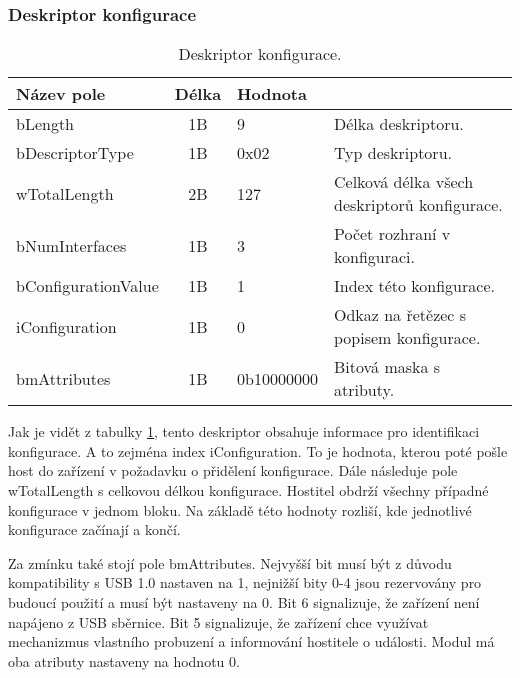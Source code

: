 \subsubsection{Deskriptor konfigurace}
\begin{table}[ht!]
\begin{center}
\begin{tabular}{|l|c|l|l|}
\hline 
Název pole & Délka & Hodnota &  \\ 
\hline
bLength & 1B & 9 & Délka deskriptoru.\\
\hline
bDescriptorType & 1B & 0x02 & Typ deskriptoru. \\
\hline
wTotalLength & 2B & 127 & Celková délka všech deskriptorů konfigurace.\\
\hline
bNumInterfaces & 1B & 3 & Počet rozhraní v konfiguraci.\\
\hline
bConfigurationValue & 1B & 1 & Index této konfigurace.\\
\hline
iConfiguration & 1B & 0 & Odkaz na řetězec s popisem konfigurace.\\
\hline
bmAttributes & 1B & 0b10000000 & Bitová maska s atributy.\\
\hline
\end{tabular} 
\end{center}
\caption{Deskriptor konfigurace.}
\label{tab:usb-conf-desc} 
\end{table}

Jak je vidět z tabulky \ref{tab:usb-conf-desc}, tento deskriptor obsahuje informace pro identifikaci konfigurace. A to zejména index iConfiguration. To je hodnota, kterou poté pošle host do zařízení v požadavku o přidělení konfigurace. Dále následuje pole wTotalLength s celkovou délkou konfigurace. Hostitel obdrží všechny případné konfigurace v jednom bloku. Na základě této hodnoty rozliší, kde jednotlivé konfigurace začínají a končí.

Za zmínku také stojí pole bmAttributes. Nejvyšší bit musí být z důvodu kompatibility s USB 1.0 nastaven na 1, nejnižší bity 0-4 jsou rezervovány pro budoucí použití a musí být nastaveny na 0. Bit 6 signalizuje, že zařízení není napájeno z USB sběrnice. Bit 5 signalizuje, že zařízení chce využívat mechanizmus vlastního probuzení a informování hostitele o události. Modul má oba atributy nastaveny na hodnotu 0.


